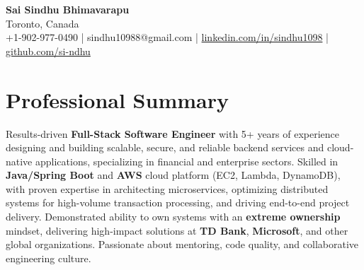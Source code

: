 \documentclass[letterpaper,11pt]{article}
\begin{document}
\begin{center}
  {\Large \textbf{Sai Sindhu Bhimavarapu}} \\
  Toronto, Canada \\
  +1-902-977-0490 \enspace | \enspace sindhu10988@gmail.com \enspace | \enspace \href{https://www.linkedin.com/in/sindhu1098/}{linkedin.com/in/sindhu1098} \enspace | \enspace \href{https://github.com/si-ndhu}{github.com/si-ndhu}
\end{center}

\section{Professional Summary}
  \begin{itemize}[leftmargin=0.15in, label={}]
    \small{\item{
     Results-driven \textbf{Full-Stack Software Engineer} with 5+ years of experience designing and building scalable, secure, and reliable backend services and cloud-native applications, specializing in financial and enterprise sectors. Skilled in \textbf{Java/Spring Boot} and \textbf{AWS} cloud platform (EC2, Lambda, DynamoDB), with proven expertise in architecting microservices, optimizing distributed systems for high-volume transaction processing, and driving end-to-end project delivery. Demonstrated ability to own systems with an \textbf{extreme ownership} mindset, delivering high-impact solutions at \textbf{TD Bank}, \textbf{Microsoft}, and other global organizations. Passionate about mentoring, code quality, and collaborative engineering culture.
    }}
  \end{itemize}
\vspace{-16pt}

\end{document}

